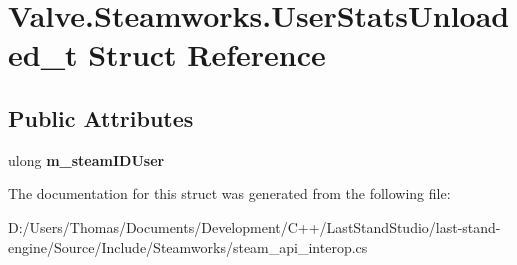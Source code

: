 \hypertarget{structValve_1_1Steamworks_1_1UserStatsUnloaded__t}{}\section{Valve.\+Steamworks.\+User\+Stats\+Unloaded\+\_\+t Struct Reference}
\label{structValve_1_1Steamworks_1_1UserStatsUnloaded__t}
\subsection*{Public Attributes}
\begin{DoxyCompactItemize}
\item 
\hypertarget{structValve_1_1Steamworks_1_1UserStatsUnloaded__t_ae7445e0a5e82f55970a740c89f367b9b}{}ulong {\bfseries m\+\_\+steam\+I\+D\+User}\label{structValve_1_1Steamworks_1_1UserStatsUnloaded__t_ae7445e0a5e82f55970a740c89f367b9b}

\end{DoxyCompactItemize}


The documentation for this struct was generated from the following file\+:\begin{DoxyCompactItemize}
\item 
D\+:/\+Users/\+Thomas/\+Documents/\+Development/\+C++/\+Last\+Stand\+Studio/last-\/stand-\/engine/\+Source/\+Include/\+Steamworks/steam\+\_\+api\+\_\+interop.\+cs\end{DoxyCompactItemize}
